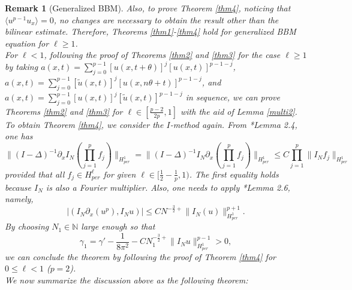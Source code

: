 \documentclass[10pt,a4paper,final]{article}
\numberwithin{equation}{section}
\newtheorem{remark}[theorem]{Remark}
\newcommand{\lan}{\langle}
\newcommand{\ran}{\rangle}
\newcommand{\N}{\mathbb{N}}
\newcommand{\Gg}{\gamma}
\newcommand{\Gth}{\theta}
\begin{document}
\begin{remark}[Generalized BBM]
    Also, to prove Theorem \ref{thm4}, noticing that $\lan u^{p-1}u_x\ran =0$, no changes are necessary to obtain the result other than the bilinear estimate. Therefore,  Theorems \ref{thm1}-\ref{thm4} hold for generalized BBM equation for $\ell\geq 1$.\\

    For $\ell <1$, following the proof of Theorems \ref{thm2} and \ref{thm3} for the case $\ell\geq 1$ by taking $a(x,t)=\sum_{j=0}^{p-1}[u(x,t+\Gth)]^{j}[u(x,t)]^{p-1-j}$, $a(x,t)=\sum_{j=0}^{p-1}[\widetilde{u}(x,t)]^{j}[u(x,n\Gth+t)]^{p-1-j}$, and $a(x,t)=\sum_{j=0}^{p-1}[u(x,t)]^{j}[\widetilde{u}(x,t)]^{p-1-j}$ in sequence, we can prove Theorems \ref{thm2} and \ref{thm3} for $\ell\in [\frac{p-2}{2p},1]$ with the aid of Lemma \ref{multi2}. To obtain Theorem \ref{thm4}, we consider the $I$-method again. From \cite{MWang2}*{Lemma 2.4}, one has 
    $$\|(I-\Delta)^{-1}\partial_xI_N(\prod_{j=1}^p f_j)\|_{H^1_{per}}=\|(I-\Delta)^{-1}I_N\partial_x(\prod_{j=1}^p f_j)\|_{H^1_{per}}\leq C\prod_{j=1}^p \|I_Nf_j\|_{H^1_{per}}$$
    provided that all $f_j\in H^{\ell}_{per}$ for given $\ell\in [\frac{1}{2}-\frac{1}{p},1)$. The first equality holds because $I_N$ is also a Fourier multiplier. Also,  one needs to apply \cite{MWang2}*{Lemma 2.6}, namely, 
    $$|(I_N\partial_x(u^p), I_N u)|\leq C N^{-\frac{3}{2}+}\|I_N(u)\|_{H^1_{per}}^{p+1}.$$ By choosing $N_1\in \N$ large enough so that 
    $$\Gg_1=\Gg' -\frac{1}{8\pi^2}-CN_1^{-\frac{3}{2}+}\|I_Nu\|_{H^1_{per}}^{p-1}>0,$$ we can conclude the theorem by following the proof of Theorem \ref{thm4} for $0\leq \ell<1$ ($p=2$).\\


    We now summarize the discussion above as the following theorem: 


\end{remark}
\end{document}
